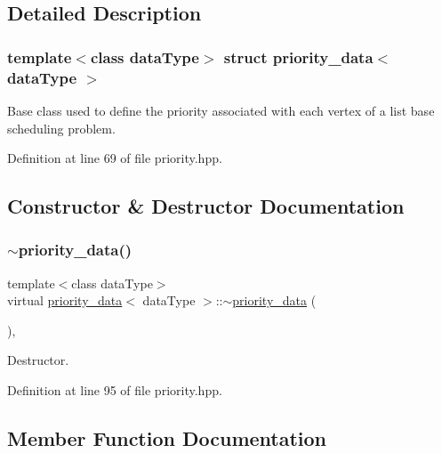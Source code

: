 \subsection{Detailed Description}
\subsubsection*{template$<$class data\+Type$>$\newline
struct priority\+\_\+data$<$ data\+Type $>$}

Base class used to define the priority associated with each vertex of a list base scheduling problem. 

Definition at line 69 of file priority.\+hpp.



\subsection{Constructor \& Destructor Documentation}
\mbox{\label{structpriority__data_a28acb9d3070e80820cd8ae7ec0c34b04}} 
\subsubsection{\texorpdfstring{$\sim$priority\+\_\+data()}{~priority\_data()}}
{\footnotesize\ttfamily template$<$class data\+Type$>$ \\
virtual \hyperlink{structpriority__data}{priority\+\_\+data}$<$ data\+Type $>$\+::$\sim$\hyperlink{structpriority__data}{priority\+\_\+data} (\begin{DoxyParamCaption}{ }\end{DoxyParamCaption})\hspace{0.3cm}{\ttfamily [inline]}, {\ttfamily [virtual]}}



Destructor. 



Definition at line 95 of file priority.\+hpp.



\subsection{Member Function Documentation}
\mbox{\label{structpriority__data_a8bfd788747602771fcd439c49f9d2ae0}} 
